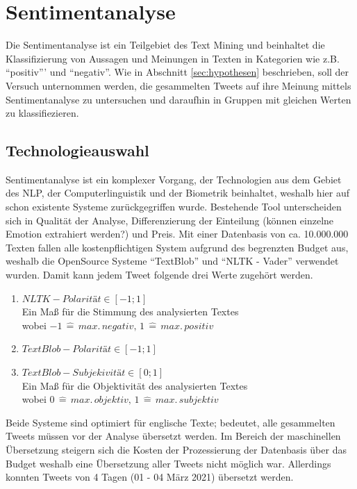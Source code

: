 \chapter{Sentimentanalyse}
\label{chap:sentiment}
Die Sentimentanalyse ist ein Teilgebiet des \gls{Text Mining} und beinhaltet die Klassifizierung von Aussagen und Meinungen in Texten in Kategorien wie z.B. "`positiv"'' und "`negativ"'. Wie in Abschnitt \ref{sec:hypothesen} beschrieben, soll der Versuch unternommen werden, die gesammelten Tweets auf ihre Meinung mittels Sentimentanalyse zu untersuchen und daraufhin in Gruppen mit gleichen Werten zu klassifiezieren. 
\section{Technologieauswahl}
\label{sec:Technologieauswahl}
Sentimentanalyse ist ein komplexer Vorgang, der Technologien aus dem Gebiet des \ac{NLP}, der Computerlinguistik und der Biometrik beinhaltet, weshalb hier auf schon existente Systeme zurückgegriffen wurde.
Bestehende Tool unterscheiden sich in Qualität der Analyse, Differenzierung der Einteilung (können einzelne Emotion extrahiert werden?) und Preis. 
Mit einer Datenbasis von ca. 10.000.000 Texten fallen alle kostenpflichtigen System aufgrund des begrenzten Budget aus, weshalb  die \gls{OpenSource} Systeme "`TextBlob"' und "`NLTK - Vader"' verwendet wurden. Damit kann jedem Tweet folgende drei Werte zugehört werden.
\begin{enumerate}
	\item $NLTK - Polarität \in [-1;1]$\\ Ein Maß für die Stimmung des analysierten Textes\\ wobei $-1\,\hat{=}\,max.\,negativ,\,1\,\hat{=} \,max.\,positiv$ 
	\item $TextBlob - Polarität \in [-1;1]$
	\item $TextBlob - Subjekivität \in [0;1]$\\ Ein Maß für die Objektivität des analysierten Textes\\ wobei $0\,\hat{=}\,max.\,objektiv,\,1\,\hat{=} \,max.\,subjektiv$ 
\end{enumerate}

Beide Systeme sind optimiert für englische Texte; bedeutet, alle gesammelten Tweets müssen vor der Analyse übersetzt werden. Im Bereich der maschinellen Übersetzung steigern sich die Kosten der Prozessierung der Datenbasis über das Budget weshalb eine Übersetzung aller Tweets nicht möglich war.
Allerdings konnten Tweets von 4 Tagen (01 - 04 März 2021)  übersetzt werden.

